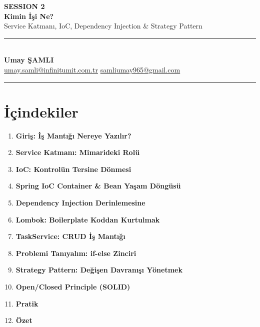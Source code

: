 \documentclass[11pt,a4paper]{article}
\begin{document}
\thispagestyle{empty}
\begin{center}
\vspace*{3cm}

{\Huge\bfseries SESSION 2}\\[0.8cm]
{\Huge\bfseries Kimin \.{I}\c{s}i Ne?}\\[1.2cm]
{\large Service Katman{\i}, IoC, Dependency Injection \& Strategy Pattern}\\[0.8cm]
{\color{accentred}\rule{0.6\textwidth}{2pt}}\\[1.2cm]
{\normalsize\textbf{Umay \c{S}AMLI}}\\[0.3cm]
{\small \href{mailto:umay.samli@infinitumit.com.tr}{umay.samli@infinitumit.com.tr} \textbar{} \href{mailto:samliumay965@gmail.com}{samliumay965@gmail.com}}\\[1.5cm]

\vfill
{\small\color{gray}\rule{0.5\textwidth}{0.5pt}}
\end{center}

\newpage

\section*{\.{I}\c{c}indekiler}

\begin{enumerate}[leftmargin=1.5cm]
    \item \textbf{Giri\c{s}: \.{I}\c{s} Mant{\i}\u{g}{\i} Nereye Yaz{\i}l{\i}r?}
    \item \textbf{Service Katman{\i}: Mimarideki Rol\"{u}}
    \item \textbf{IoC: Kontrolün Tersine D\"{o}nmesi}
    \item \textbf{Spring IoC Container \& Bean Ya\c{s}am D\"{o}ng\"{u}s\"{u}}
    \item \textbf{Dependency Injection Derinlemesine}
    \item \textbf{Lombok: Boilerplate Koddan Kurtulmak}
    \item \textbf{TaskService: CRUD \.{I}\c{s} Mant{\i}\u{g}{\i}}
    \item \textbf{Problemi Tan{\i}yal{\i}m: if-else Zinciri}
    \item \textbf{Strategy Pattern: De\u{g}i\c{s}en Davran{\i}\c{s}{\i} Y\"{o}netmek}
    \item \textbf{Open/Closed Principle (SOLID)}
    \item \textbf{Pratik}
    \item \textbf{\"{O}zet}
\end{enumerate}
\end{document}
